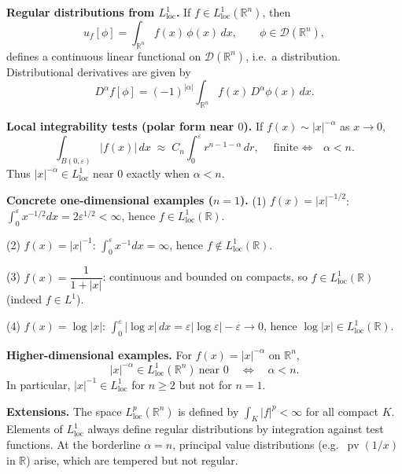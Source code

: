 \begin{problem}[CP-III-0024]
\bigskip

\par\smallskip\noindent\textbf{Regular distributions from $L^1_{\mathrm{loc}}$.}\quad
If $f\in L^1_{\mathrm{loc}}(\mathbb R^n)$, then
\[
u_f[\phi]=\int_{\mathbb R^n} f(x)\,\phi(x)\,dx ,\qquad \phi\in\mathcal D(\mathbb R^n),
\]
defines a continuous linear functional on $\mathcal D(\mathbb R^n)$, i.e.\ a distribution.
Distributional derivatives are given by
\[
D^\alpha f[\phi]=(-1)^{|\alpha|}\int_{\mathbb R^n} f(x)\,D^\alpha\phi(x)\,dx .
\]

\bigskip

\par\smallskip\noindent\textbf{Local integrability tests (polar form near $0$).}\quad
If $f(x)\sim |x|^{-\alpha}$ as $x\to 0$,
\[
\int_{B(0,\varepsilon)} |f(x)|\,dx \;\approx\; C_n\!\int_0^\varepsilon r^{n-1-\alpha}\,dr,
\quad\text{finite $\iff$ } \alpha<n .
\]
Thus $|x|^{-\alpha}\in L^1_{\mathrm{loc}}$ near $0$ exactly when $\alpha<n$.

\bigskip

\par\smallskip\noindent\textbf{Concrete one-dimensional examples ($n=1$).}\quad
(1) $f(x)=|x|^{-1/2}$: $\displaystyle \int_0^\varepsilon x^{-1/2}dx=2\varepsilon^{1/2}<\infty$, hence $f\in L^1_{\mathrm{loc}}(\mathbb R)$.
\medskip

(2) $f(x)=|x|^{-1}$: $\displaystyle \int_0^\varepsilon x^{-1}dx=\infty$, hence $f\notin L^1_{\mathrm{loc}}(\mathbb R)$.
\medskip

(3) $f(x)=\dfrac{1}{1+|x|}$: continuous and bounded on compacts, so $f\in L^1_{\mathrm{loc}}(\mathbb R)$ (indeed $f\in L^1$).
\medskip

(4) $f(x)=\log|x|$: $\displaystyle \int_0^\varepsilon |\log x|\,dx=\varepsilon|\log\varepsilon|-\varepsilon\to0$, hence $\log|x|\in L^1_{\mathrm{loc}}(\mathbb R)$.

\bigskip

\par\smallskip\noindent\textbf{Higher-dimensional examples.}\quad
For $f(x)=|x|^{-\alpha}$ on $\mathbb R^n$,
\[
|x|^{-\alpha}\in L^1_{\mathrm{loc}}(\mathbb R^n) \ \text{near }0
\quad\Longleftrightarrow\quad \alpha<n .
\]
In particular, $|x|^{-1}\in L^1_{\mathrm{loc}}$ for $n\ge2$ but not for $n=1$.

\bigskip

\par\smallskip\noindent\textbf{Extensions.}\quad
The space $L^p_{\mathrm{loc}}(\mathbb R^n)$ is defined by $\int_K |f|^p<\infty$ for all compact $K$.
Elements of $L^1_{\mathrm{loc}}$ always define regular distributions by integration against test functions.
At the borderline $\alpha=n$, principal value distributions (e.g.\ $\operatorname{pv}(1/x)$ in $\mathbb R$) arise, which are tempered but not regular.



\end{problem}
